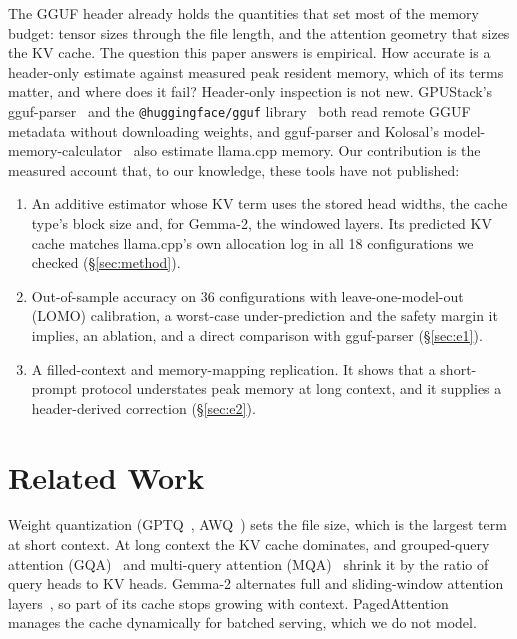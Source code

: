 \documentclass[conference]{IEEEtran}
\begin{document}
The GGUF header already holds the quantities that set most of the memory budget: tensor sizes through the file length, and the attention geometry that sizes the KV cache. The question this paper answers is empirical. How accurate is a header-only estimate against measured peak resident memory, which of its terms matter, and where does it fail? Header-only inspection is not new. GPUStack's gguf-parser~\cite{ggufparser} and the \texttt{@huggingface/gguf} library~\cite{hfgguf} both read remote GGUF metadata without downloading weights, and gguf-parser and Kolosal's model-memory-calculator~\cite{kolosal} also estimate llama.cpp memory. Our contribution is the measured account that, to our knowledge, these tools have not published:
\begin{enumerate}
\item An additive estimator whose KV term uses the stored head widths, the cache type's block size and, for Gemma-2, the windowed layers. Its predicted KV cache matches llama.cpp's own allocation log in all 18 configurations we checked (\S\ref{sec:method}).
\item Out-of-sample accuracy on 36 configurations with leave-one-model-out (LOMO) calibration, a worst-case under-prediction and the safety margin it implies, an ablation, and a direct comparison with gguf-parser (\S\ref{sec:e1}).
\item A filled-context and memory-mapping replication. It shows that a short-prompt protocol understates peak memory at long context, and it supplies a header-derived correction (\S\ref{sec:e2}).
\end{enumerate}

\section{Related Work}
\label{sec:related}
Weight quantization (GPTQ~\cite{gptq}, AWQ~\cite{awq}) sets the file size, which is the largest term at short context. At long context the KV cache dominates, and grouped-query attention (GQA)~\cite{gqa} and multi-query attention (MQA)~\cite{mqa} shrink it by the ratio of query heads to KV heads. Gemma-2 alternates full and sliding-window attention layers~\cite{gemma2}, so part of its cache stops growing with context. PagedAttention~\cite{vllm} manages the cache dynamically for batched serving, which we do not model.
\end{document}
